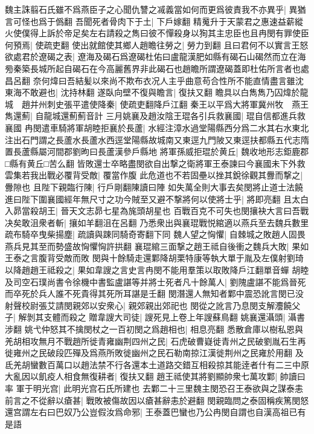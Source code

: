 魏主誅翦石氏雖不爲燕臣子之心聞仇讐之㓕義當如何而更爲彼責我不亦異乎|{
	異猶言可怪也爲于僞翻}
吾聞死者骨肉下于土|{
	下戶嫁翻}
精䰟升于天蒙君之惠速益薪縱火使僕得上訴於帝足矣左右請殺之雋曰彼不憚殺身以狥其主忠臣也且冉閔有罪使臣何預焉|{
	使疏吏翻}
使出就館使其鄉人趙瞻往勞之|{
	勞力到翻}
且曰君何不以實言王怒欲處君於遼碣之表|{
	遼海及碣石爲遼碣杜佑曰盧龍漢肥如縣有碣石山碣然而立在海㫄秦築長城所起自碣石在今高麗舊界非此碣石也趙瞻所謂遼碣蓋即杜佑所言者也處昌呂翻}
奈何煒曰吾結髪以來尚不欺布衣况人主乎曲意苟合性所不能直情盡言雖沈東海不敢避也|{
	沈持林翻}
遂臥向壁不復與瞻言|{
	復扶又翻}
瞻具以白雋雋乃囚煒於龍城　趙并州刺史張平遣使降秦|{
	使疏吏翻降戶江翻}
秦王以平爲大將軍冀州牧　燕王雋還薊|{
	自龍城還薊薊音計}
三月姚襄及趙汝陰王琨各引兵救襄國|{
	琨自信都進兵救襄國}
冉閔遣車騎將軍胡睦拒襄於長蘆|{
	水經注漳水過堂陽縣西分爲二水其右水東北注出石門謂之長蘆水長蘆水西逕堂陽縣故城南又東逕九門陂又東逕扶都縣五代志隋置長蘆縣屬河間郡劉昫曰長蘆漢參戶縣地}
將軍孫威拒琨於黄丘|{
	魏收地形志鉅鹿郡□縣有黄丘□苦么翻}
皆敗還士卒略盡閔欲自出撃之衛將軍王泰諫曰今襄國未下外救雲集若我出戰必覆背受敵|{
	覆當作腹}
此危道也不若固壘以挫其銳徐觀其釁而撃之|{
	釁隙也}
且陛下親臨行陳|{
	行戶剛翻陳讀曰陣}
如失萬全則大事去矣閔將止道士法饒進曰陛下圍襄國經年無尺寸之功今賊至又避不撃將何以使將士乎|{
	將即亮翻}
且太白入昴當殺胡王|{
	晉天文志昴七星為旄頭胡星也}
百戰百克不可失也閔攘袂大言曰吾戰决矣敢沮衆者斬|{
	攘如羊翻沮在呂翻}
乃悉衆出與襄琨戰悦綰適以燕兵至去魏兵數里疏布騎卒曳柴揚塵|{
	疏讀與踈同騎奇寄翻下同}
魏人望之恟懼|{
	自棘城之敗趙人固畏燕兵見其至而勢盛故恟懼恟許拱翻}
襄琨綰三面撃之趙王祗自後衝之魏兵大敗|{
	果如王泰之言腹背受敵而敗}
閔與十餘騎走還鄴降胡栗特康等執大單于胤及左僕射劉琦以降趙趙王祗殺之|{
	果如韋謏之言史言冉閔不能用羣策以取敗降戶江翻單音蟬}
胡睦及司空石璞尚書令徐機中書監盧諶等并將士死者凡十餘萬人|{
	劉隗盧諶不能爲晉死而卒死於兵人誰不死貴得其死所耳諶是壬翻}
閔潛還人無知者鄴中震恐訛言閔已没射聲校尉張艾請閔親郊以安衆心|{
	親郊親出郊祀也}
閔從之訛言乃息閔支解灋饒父子|{
	解剝其支體而殺之}
贈韋謏大司徒|{
	謏死見上卷上年謏蘇鳥翻}
姚襄還灄頭|{
	灄書涉翻}
姚弋仲怒其不擒閔杖之一百初閔之爲趙相也|{
	相息亮翻}
悉散倉庫以樹私恩與羌胡相攻無月不戰趙所徙青雍幽荆四州之民|{
	石虎破曹嶷徙青州之民破劉胤石生再徙雍州之民破段匹殫及爲燕所敗徙幽州之民石勒南掠江漢徙荆州之民雍於用翻}
及氐羌胡蠻數百萬口以趙法禁不行各還本土道路交錯互相殺掠其能逹者什有二三中原大亂因以飢疫人相食無復耕者|{
	復扶又翻}
趙王祗使其將劉顯帥衆七萬攻鄴|{
	帥讀曰率}
軍于明光宫|{
	此明光宫石氏所建也}
去鄴二十三里魏主閔恐召王泰欲與之謀泰恚前言之不從辭以瘡甚|{
	戰敗被傷故因以瘡甚辭恚於避翻}
閔親臨問之泰固稱疾篤閔怒還宫謂左右曰巴奴乃公豈假汝爲命邪|{
	王泰蓋巴蠻也乃公冉閔自謂也自漢高祖已有是語}
